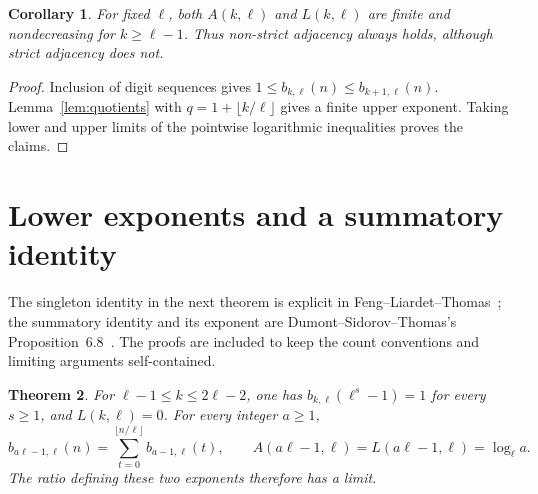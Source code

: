\documentclass[11pt]{article}
\newtheorem{theorem}{Theorem}
\newtheorem{corollary}[theorem]{Corollary}
\begin{document}
\begin{corollary}\label{cor:monotone}
For fixed $\ell$, both $A(k,\ell)$ and $L(k,\ell)$ are finite
and nondecreasing for $k\ge\ell-1$.
Thus non-strict adjacency always holds, although strict adjacency does not.
\end{corollary}
\begin{proof}
Inclusion of digit sequences gives
$1\le b_{k,\ell}(n)\le b_{k+1,\ell}(n)$.
Lemma~\ref{lem:quotients} with $q=1+\lfloor k/\ell\rfloor$
gives a finite upper exponent. Taking lower and upper limits of the
pointwise logarithmic inequalities proves the claims.
\end{proof}

\section{Lower exponents and a summatory identity}
The singleton identity in the next theorem is explicit in
Feng--Liardet--Thomas~\cite[p.~50]{FLT}; the summatory identity and
its exponent are Dumont--Sidorov--Thomas's Proposition~6.8~\cite{DST}.
The proofs are included to keep the count conventions and limiting
arguments self-contained.
\begin{theorem}\label{thm:lower}
For $\ell-1\le k\le2\ell-2$, one has
$b_{k,\ell}(\ell^s-1)=1$ for every $s\ge1$, and $L(k,\ell)=0$.
For every integer $a\ge1$,
\begin{equation}\label{eq:summatory}
 b_{a\ell-1,\ell}(n)=\sum_{t=0}^{\lfloor n/\ell\rfloor}b_{a-1,\ell}(t),
 \qquad A(a\ell-1,\ell)=L(a\ell-1,\ell)=\log_\ell a.
\end{equation}
The ratio defining these two exponents therefore has a limit.
\end{theorem}
\end{document}
